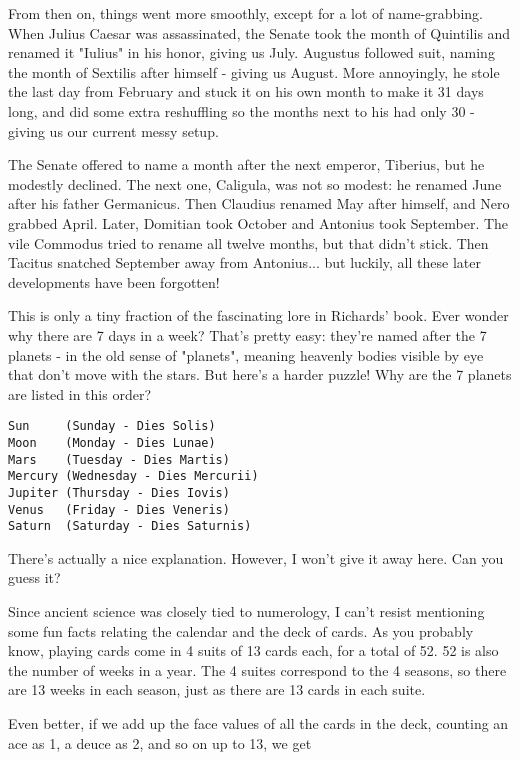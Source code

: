 From then on, things went more smoothly, except for a lot of name-grabbing.  
When Julius Caesar was assassinated, the Senate took the month of Quintilis 
and renamed it "Iulius" in his honor, giving us July.  Augustus followed
suit, naming the month of Sextilis after himself - giving us August. 
More annoyingly, he stole the last day from February and stuck it on his
own month to make it 31 days long, and did some extra reshuffling so the
months next to his had only 30 - giving us our current messy setup.

The Senate offered to name a month after the next emperor, Tiberius, but
he modestly declined.  The next one, Caligula, was not so modest: he
renamed June after his father Germanicus.  Then Claudius renamed May
after himself, and Nero grabbed April.  Later, Domitian took October and
Antonius took September.  The vile Commodus tried to rename all twelve
months, but that didn't stick.  Then Tacitus snatched September away
from Antonius... but luckily, all these later developments have been
forgotten!

This is only a tiny fraction of the fascinating lore in Richards' book. 
Ever wonder why there are 7 days in a week?  That's pretty easy: they're
named after the 7 planets - in the old sense of "planets", meaning
heavenly bodies visible by eye that don't move with the stars.  But
here's a harder puzzle!  Why are the 7 planets are listed in this order?

\begin{verbatim}
Sun     (Sunday - Dies Solis)
Moon    (Monday - Dies Lunae)
Mars    (Tuesday - Dies Martis)
Mercury (Wednesday - Dies Mercurii)
Jupiter (Thursday - Dies Iovis)
Venus   (Friday - Dies Veneris)
Saturn  (Saturday - Dies Saturnis)
\end{verbatim}
    
There's actually a nice explanation.  However, I won't give it away here.
Can you guess it?

Since ancient science was closely tied to numerology, I can't resist
mentioning some fun facts relating the calendar and the deck of cards. 
As you probably know, playing cards come in 4 suits of 13 cards each,
for a total of 52.  52 is also the number of weeks in a year.  The 4
suites correspond to the 4 seasons, so there are 13 weeks in each
season, just as there are 13 cards in each suite.  

Even better, if we add up the face values of all the cards in the deck,
counting an ace as 1, a deuce as 2, and so on up to 13, we get

